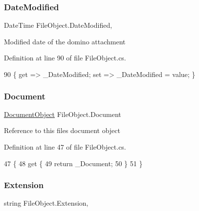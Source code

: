 \subsubsection{\texorpdfstring{Date\+Modified}{DateModified}}
{\footnotesize\ttfamily Date\+Time File\+Object.\+Date\+Modified\hspace{0.3cm}{\ttfamily [get]}, {\ttfamily [set]}}



Modified date of the domino attachment 



Definition at line 90 of file File\+Object.\+cs.


\begin{DoxyCode}
90 \{ \textcolor{keyword}{get} => \_DateModified; \textcolor{keyword}{set} => \_DateModified = value; \}
\end{DoxyCode}
\mbox{\label{class_file_object_a0c9650a6ae1efb95f8211f9fa3b883fe}} 
\subsubsection{\texorpdfstring{Document}{Document}}
{\footnotesize\ttfamily \mbox{\hyperlink{class_document_object}{Document\+Object}} File\+Object.\+Document\hspace{0.3cm}{\ttfamily [get]}}



Reference to this files document object 



Definition at line 47 of file File\+Object.\+cs.


\begin{DoxyCode}
47                                    \{
48         \textcolor{keyword}{get} \{
49             \textcolor{keywordflow}{return} \_Document;
50         \}
51     \}
\end{DoxyCode}
\mbox{\label{class_file_object_ae25b58dc19def323da91a48e17ba13ed}} 
\subsubsection{\texorpdfstring{Extension}{Extension}}
{\footnotesize\ttfamily string File\+Object.\+Extension\hspace{0.3cm}{\ttfamily [get]}, {\ttfamily [set]}}



